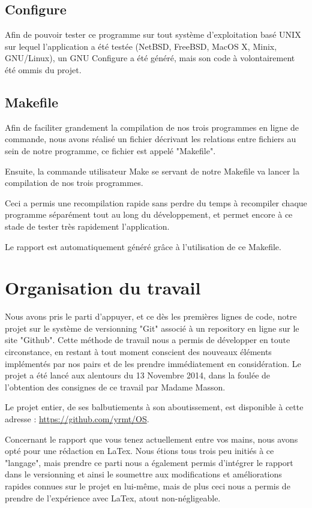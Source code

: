 \documentclass{report}
\begin{document}
{		\subsection{Configure}

			Afin de pouvoir tester ce programme sur tout système d'exploitation basé UNIX sur lequel l'application a été testée (NetBSD, FreeBSD, MacOS X, Minix, GNU/Linux), un GNU Configure a été généré, mais son code à volontairement été ommis du projet.

		\subsection{Makefile}

			Afin de faciliter grandement la compilation de nos trois programmes en ligne de commande, nous avons réalisé un fichier décrivant les
			relations entre fichiers au sein de notre programme, ce fichier est appelé "Makefile".

			Ensuite, la commande utilisateur Make se servant de notre Makefile va lancer la compilation de nos trois programmes.

			Ceci a permis une recompilation rapide sans perdre du temps à recompiler chaque programme séparément tout au long du développement,
			et permet encore à ce stade de tester très rapidement l'application.

                        Le rapport est automatiquement généré grâce à l'utilisation de ce Makefile.


	\section{Organisation du travail}

		Nous avons pris le parti d'appuyer, et ce dès les premières lignes de code, notre projet sur le système de versionning "Git" associé
		à un repository en ligne sur le site "Github".
		Cette méthode de travail nous a permis de développer en toute circonstance, en restant à tout moment conscient des nouveaux éléments 
		implémentés par nos pairs et de les prendre immédiatement en considération.
		Le projet a été lancé aux alentours du 13 Novembre 2014, dans la foulée de l'obtention des consignes de ce travail par Madame Masson.

		Le projet entier, de ses balbutiements à son aboutissement, est disponible à cette adresse : \color{blue}\url{https://github.com/yrmt/OS}\color{black}.

		Concernant le rapport que vous tenez actuellement entre vos mains, nous avons opté pour une rédaction en LaTex.
		Nous étions tous trois peu initiés à ce "langage", mais prendre ce parti nous a également permis d’intégrer le rapport
		dans le versionning et ainsi le soumettre aux modifications et améliorations rapides connues sur le projet en lui-même, mais de plus
		ceci nous a permis de prendre de l'expérience avec LaTex, atout non-négligeable.

}
\end{document}
